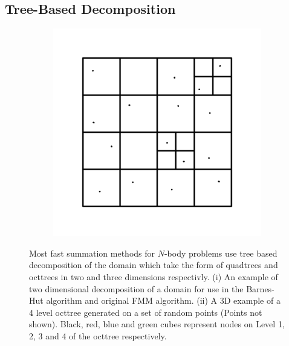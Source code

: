 \subsection{Tree-Based Decomposition} \label{sec:TreeDecomp}

\begin{figure}
    \begin{subfigure}[b]{0.4\textwidth}
        \centering
        \includegraphics[width=\textwidth]{Images/KIFMM/Decomposition.pdf}
        \caption{\label{fig:2DDecompostion}}
    \end{subfigure}
    \hfill
    \begin{subfigure}[b]{0.4\textwidth}
    \centering
        \resizebox{\linewidth}{!}{}
        \caption{\label{fig:Decompostionexample}}
    \end{subfigure}
    \caption[Decomposition of domain in two and three dimensions.]{Most fast summation methods for $N$-body problems use tree based decomposition of the domain which take the form of quadtrees and octtrees in two and three dimensions respectivly. (i) An example of two dimensional decomposition of a domain for use in the Barnes-Hut algorithm and original FMM algorithm. (ii) A 3D example of a 4 level octtree generated on a set of random points (Points not shown). Black, red, blue and green cubes represent nodes on Level 1, 2, 3 and 4 of the octtree respectively.}
\end{figure}

